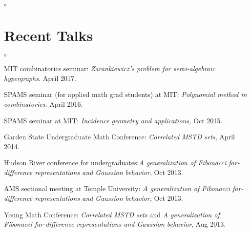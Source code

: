 \documentclass[margin,line]{res}
\newenvironment{list2}{
  \begin{list}{$\circ$}{%
      \setlength{\itemsep}{0in}
      \setlength{\parsep}{0in} \setlength{\parskip}{0in}
      \setlength{\topsep}{0in} \setlength{\partopsep}{0in}
      \setlength{\leftmargin}{0.2in}}}{\end{list}}
\begin{document}
\begin{resume}
\begin{list2}
\end{list2}

\section{\sc Recent Talks}
\begin{list2}
\item[] MIT combinatorics seminar: \emph{Zarankiewicz's problem for semi-algebraic hypergraphs.} April 2017.
\item[] SPAMS seminar (for applied math grad students) at MIT: \emph{Polynomial method in combinatorics.} April 2016.
\item[] SPAMS seminar at MIT: \emph{Incidence geometry and applications,} Oct 2015.
\item[] Garden State Undergraduate Math Conference: \emph{Correlated MSTD sets}, April 2014. 
\item[] Hudson River conference for undergraduates:\emph{A generalization of Fibonacci far-difference representations and Gaussion behavior}, Oct 2013. 
\item[] AMS sectional meeting at Temple University: \emph{A generalization of Fibonacci far-difference representations and Gaussion behavior}, Oct 2013.
\item[] Young Math Conference: \emph{Correlated MSTD sets} and \emph{A generalization of Fibonacci far-difference representations and Gaussion behavior}, Aug 2013.

\end{list2}

\end{resume}
\end{document}
